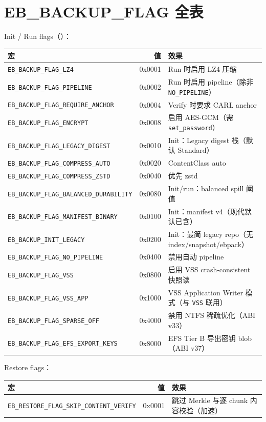 \section{EB\_BACKUP\_FLAG 全表}

Init / Run flags（）：

\begin{longtable}{@{}lrp{7.5cm}@{}}
\toprule
宏 & 值 & 效果 \\
\midrule
\texttt{EB\_BACKUP\_FLAG\_LZ4} & 0x0001 & Run 时启用 LZ4 压缩 \\
\texttt{EB\_BACKUP\_FLAG\_PIPELINE} & 0x0002 & Run 时启用 pipeline（除非 \texttt{NO\_PIPELINE}） \\
\texttt{EB\_BACKUP\_FLAG\_REQUIRE\_ANCHOR} & 0x0004 & Verify 时要求 CARL anchor \\
\texttt{EB\_BACKUP\_FLAG\_ENCRYPT} & 0x0008 & 启用 AES-GCM（需 \texttt{set\_password}） \\
\texttt{EB\_BACKUP\_FLAG\_LEGACY\_DIGEST} & 0x0010 & Init：Legacy digest 栈（默认 Standard） \\
\texttt{EB\_BACKUP\_FLAG\_COMPRESS\_AUTO} & 0x0020 & ContentClass auto \\
\texttt{EB\_BACKUP\_FLAG\_COMPRESS\_ZSTD} & 0x0040 & 优先 zstd \\
\texttt{EB\_BACKUP\_FLAG\_BALANCED\_DURABILITY} & 0x0080 & Init/run：balanced spill 阈值 \\
\texttt{EB\_BACKUP\_FLAG\_MANIFEST\_BINARY} & 0x0100 & Init：manifest v4（现代默认已含） \\
\texttt{EB\_BACKUP\_INIT\_LEGACY} & 0x0200 & Init：最简 legacy repo（无 index/snapshot/ebpack） \\
\texttt{EB\_BACKUP\_FLAG\_NO\_PIPELINE} & 0x0400 & 禁用自动 pipeline \\
\texttt{EB\_BACKUP\_FLAG\_VSS} & 0x0800 & 启用 VSS crash-consistent 快照读 \\
\texttt{EB\_BACKUP\_FLAG\_VSS\_APP} & 0x1000 & VSS Application Writer 模式（与 \texttt{VSS} 联用） \\
\texttt{EB\_BACKUP\_FLAG\_SPARSE\_OFF} & 0x4000 & 禁用 NTFS 稀疏优化（ABI v33） \\
\texttt{EB\_BACKUP\_FLAG\_EFS\_EXPORT\_KEYS} & 0x8000 & EFS Tier B 导出密钥 blob（ABI v37） \\
\bottomrule
\end{longtable}

Restore flags：

\begin{longtable}{@{}lrp{8cm}@{}}
\toprule
宏 & 值 & 效果 \\
\midrule
\texttt{EB\_RESTORE\_FLAG\_SKIP\_CONTENT\_VERIFY} & 0x0001 & 跳过 Merkle 与逐 chunk 内容校验（加速） \\
\bottomrule
\end{longtable}

